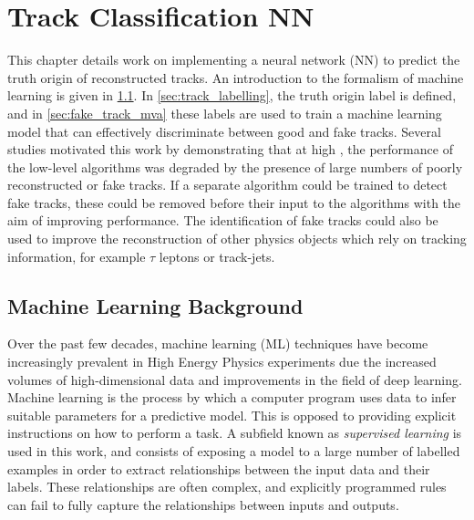 \chapter{Track Classification NN}\label{chap:track_classification_mva}

This chapter details work on implementing a neural network (NN) to predict the truth origin of reconstructed tracks.
An introduction to the formalism of machine learning is given in \cref{sec:ml_background}.
In \cref{sec:track_labelling}, the truth origin label is defined, and in \cref{sec:fake_track_mva} these labels are used to train a machine learning model that can effectively discriminate between good and fake tracks.
Several studies motivated this work by demonstrating that at high \pt, the performance of the low-level \btagging algorithms was degraded by the presence of large numbers of poorly reconstructed or fake tracks.
If a separate algorithm could be trained to detect fake tracks, these could be removed before their input to the \btagging algorithms with the aim of improving performance.
The identification of fake tracks could also be used to improve the reconstruction of other physics objects which rely on tracking information, for example $\tau$ leptons or track-jets.


\section{Machine Learning Background}\label{sec:ml_background}

Over the past few decades, machine learning (ML) techniques have become increasingly prevalent in High Energy Physics experiments due the increased volumes of high-dimensional data and improvements in the field of deep learning.
Machine learning is the process by which a computer program uses data to infer suitable parameters for a predictive model.
This is opposed to providing explicit instructions on how to perform a task.
A subfield known as \textit{supervised learning} is used in this work, and consists of exposing a model to a large number of labelled examples in order to extract relationships between the input data and their labels.
These relationships are often complex, and explicitly programmed rules can fail to fully capture the relationships between inputs and outputs.


